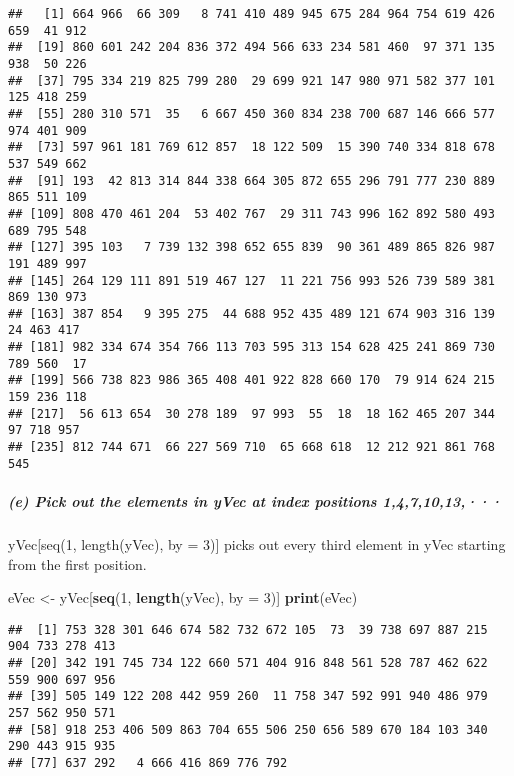 \documentclass[
]{article}
\newenvironment{Shaded}{\begin{snugshade}}{\end{snugshade}}
\newcommand{\AttributeTok}[1]{\textcolor[rgb]{0.13,0.29,0.53}{#1}}
\newcommand{\DecValTok}[1]{\textcolor[rgb]{0.00,0.00,0.81}{#1}}
\newcommand{\FunctionTok}[1]{\textcolor[rgb]{0.13,0.29,0.53}{\textbf{#1}}}
\newcommand{\NormalTok}[1]{#1}
\newcommand{\OtherTok}[1]{\textcolor[rgb]{0.56,0.35,0.01}{#1}}
\begin{document}
\begin{verbatim}
##   [1] 664 966  66 309   8 741 410 489 945 675 284 964 754 619 426 659  41 912
##  [19] 860 601 242 204 836 372 494 566 633 234 581 460  97 371 135 938  50 226
##  [37] 795 334 219 825 799 280  29 699 921 147 980 971 582 377 101 125 418 259
##  [55] 280 310 571  35   6 667 450 360 834 238 700 687 146 666 577 974 401 909
##  [73] 597 961 181 769 612 857  18 122 509  15 390 740 334 818 678 537 549 662
##  [91] 193  42 813 314 844 338 664 305 872 655 296 791 777 230 889 865 511 109
## [109] 808 470 461 204  53 402 767  29 311 743 996 162 892 580 493 689 795 548
## [127] 395 103   7 739 132 398 652 655 839  90 361 489 865 826 987 191 489 997
## [145] 264 129 111 891 519 467 127  11 221 756 993 526 739 589 381 869 130 973
## [163] 387 854   9 395 275  44 688 952 435 489 121 674 903 316 139  24 463 417
## [181] 982 334 674 354 766 113 703 595 313 154 628 425 241 869 730 789 560  17
## [199] 566 738 823 986 365 408 401 922 828 660 170  79 914 624 215 159 236 118
## [217]  56 613 654  30 278 189  97 993  55  18  18 162 465 207 344  97 718 957
## [235] 812 744 671  66 227 569 710  65 668 618  12 212 921 861 768 545
\end{verbatim}

\subparagraph{(e) Pick out the elements in yVec at index positions
1,4,7,10,13,···}\label{e-pick-out-the-elements-in-yvec-at-index-positions-1471013}

yVec{[}seq(1, length(yVec), by = 3){]} picks out every third element in
yVec starting from the first position.

\begin{Shaded}
\begin{Highlighting}[]
\NormalTok{eVec }\OtherTok{\textless{}{-}}\NormalTok{ yVec[}\FunctionTok{seq}\NormalTok{(}\DecValTok{1}\NormalTok{, }\FunctionTok{length}\NormalTok{(yVec), }\AttributeTok{by =} \DecValTok{3}\NormalTok{)]}
\FunctionTok{print}\NormalTok{(eVec)}
\end{Highlighting}
\end{Shaded}

\begin{verbatim}
##  [1] 753 328 301 646 674 582 732 672 105  73  39 738 697 887 215 904 733 278 413
## [20] 342 191 745 734 122 660 571 404 916 848 561 528 787 462 622 559 900 697 956
## [39] 505 149 122 208 442 959 260  11 758 347 592 991 940 486 979 257 562 950 571
## [58] 918 253 406 509 863 704 655 506 250 656 589 670 184 103 340 290 443 915 935
## [77] 637 292   4 666 416 869 776 792
\end{verbatim}
\end{document}
